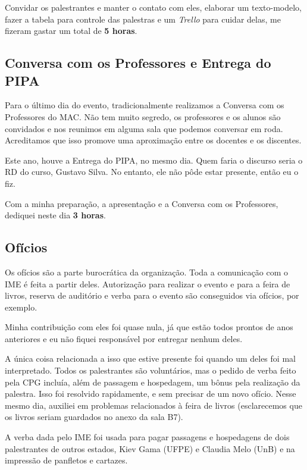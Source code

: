 \documentclass[12pt,letterpaper]{article}
\begin{document}
	Convidar os palestrantes e manter o contato com eles, elaborar um texto-modelo, fazer a tabela para controle das palestras e um \textit{Trello} para cuidar delas, me fizeram gastar um total de \textbf{5 horas}. 
	
	\subsection{Conversa com os Professores e Entrega do PIPA}
	
	Para o último dia do evento, tradicionalmente realizamos a Conversa com os Professores do MAC. Não tem muito segredo, os professores e os alunos são convidados e nos reunimos em alguma sala que podemos conversar em roda. Acreditamos que isso promove uma aproximação entre os docentes e os discentes.
	
	Este ano, houve a Entrega do PIPA, no mesmo dia. Quem faria o discurso seria o RD do curso, Gustavo Silva. No entanto, ele não pôde estar presente, então eu o fiz. 
	
	Com a minha preparação, a apresentação e a Conversa com os Professores, dediquei neste dia \textbf{3 horas}.
	
	\subsection{Ofícios}
	
	Os ofícios são a parte burocrática da organização. Toda a comunicação com o IME é feita a partir deles. Autorização para realizar o evento e para a feira de livros, reserva de auditório e verba para o evento são conseguidos via ofícios, por exemplo.
	
	Minha contribuição com eles foi quase nula, já que estão todos prontos de anos anteriores e eu não fiquei responsável por entregar nenhum deles.
	
	A única coisa relacionada a isso que estive presente foi quando um deles foi mal interpretado. Todos os palestrantes são voluntários, mas o pedido de verba feito pela CPG incluía, além de passagem e hospedagem, um bônus pela realização da palestra. Isso foi resolvido rapidamente, e sem precisar de um novo ofício. Nesse mesmo dia, auxiliei em problemas relacionados à feira de livros (esclarecemos que os livros seriam guardados no anexo da sala B7).
	
	A verba dada pelo IME foi usada para pagar passagens e hospedagens de dois palestrantes de outros estados, Kiev Gama (UFPE) e Claudia Melo (UnB) e na impressão de panfletos e cartazes.
	
\end{document}
